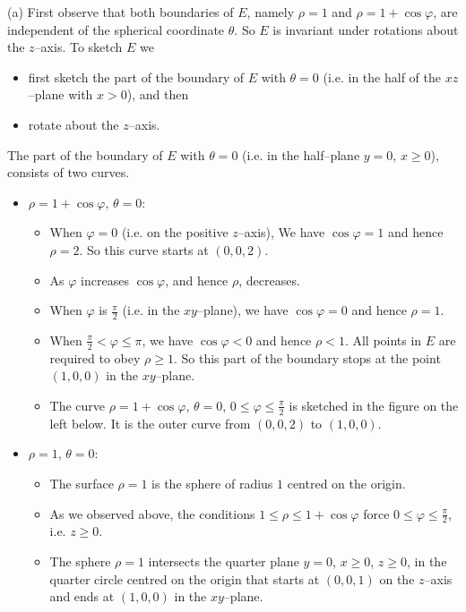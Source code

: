 \begin{solution}
(a)
First observe that both boundaries of $E$, namely $\rho=1$ and 
$\rho= 1 + \cos\varphi$, are independent of the spherical coordinate
$\theta$. So $E$ is invariant under rotations about the $z$--axis.
To sketch $E$ we
\begin{itemize}
\item
first sketch the part of the boundary of $E$ with $\theta=0$
(i.e. in the half of the $xz$--plane with $x>0$), and then

\item
rotate about the $z$--axis.
\end{itemize}
The part of the boundary of $E$ with $\theta=0$ (i.e. 
in the half--plane $y=0$, $x\ge 0$), consists of two curves.
\begin{itemize}
\item
$\rho=1+\cos\varphi$, $\theta=0$:\ \ \ 
\begin{itemize}
\item When $\varphi=0$ (i.e. on the positive $z$--axis),
We have $\cos\varphi =1$ and hence $\rho=2$.  So this curve starts
at $(0,0,2)$.
\item 
As $\varphi$ increases $\cos\varphi$, and hence $\rho$,
decreases.
\item
When $\varphi$ is $\frac{\pi}{2}$ (i.e. in the $xy$--plane),
we have $\cos\varphi =0$ and hence $\rho=1$.
\item 
When $\frac{\pi}{2}<\varphi\le \pi$, we have $\cos\varphi<0$ and hence
$\rho<1$. All points in $E$ are required to obey $\rho\ge 1$. So
this part of the boundary stops at the point $(1,0,0)$ in the $xy$--plane.
\item 
The curve $\rho=1+\cos\varphi$, $\theta=0$, $0\le\varphi\le\frac{\pi}{2}$
is sketched in the figure on the left below. It is the outer curve from
$(0,0,2)$ to $(1,0,0)$.
 
\end{itemize}
 
\item
$\rho=1$, $\theta=0$:\ \ \ 

\begin{itemize}
\item
The surface $\rho=1$ is the sphere of radius $1$ centred on the origin.

\item
As we observed above, the conditions $1\le\rho\le 1+\cos\varphi$
force $0\le\varphi\le\frac{\pi}{2}$, i.e. $z\ge 0$.

\item 
The sphere $\rho=1$ intersects the quarter plane $y=0$, $x\ge 0$, $z\ge 0$, 
in the quarter circle centred on the origin that starts at $(0,0,1)$ 
on the $z$--axis and ends at $(1,0,0)$ in the $xy$--plane.


\end{itemize}
\end{itemize}
\end{solution}
